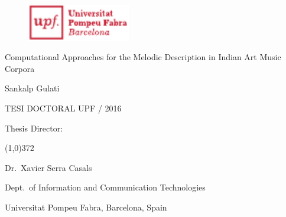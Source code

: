 
\newpage
\thispagestyle{empty}
\begin{titlingpage}
\begin{flushright}

  \begin{figure}[t]
    \begin{flushright}
      \includegraphics[width=4.5cm]{ch00/figures/upf-logo-bo}
    \end{flushright}
  \end{figure}

  \vspace*{2.2cm} 

  {\huge {Computational Approaches for the Melodic Description in Indian Art Music Corpora}}
  
  \vspace*{2cm}

  {\Large {Sankalp Gulati}}
  
  \vspace*{\fill} 
  TESI DOCTORAL UPF / 2016

\end{flushright}
  
  \vspace*{1.5cm}

  Thesis Director:

  \vspace*{-0.25cm}

  \line(1,0){372}
  
  \vspace*{0.25cm}

  Dr.~Xavier Serra Casals

  Dept.~of Information and Communication Technologies

  Universitat Pompeu Fabra, Barcelona, Spain
  
\end{titlingpage}

